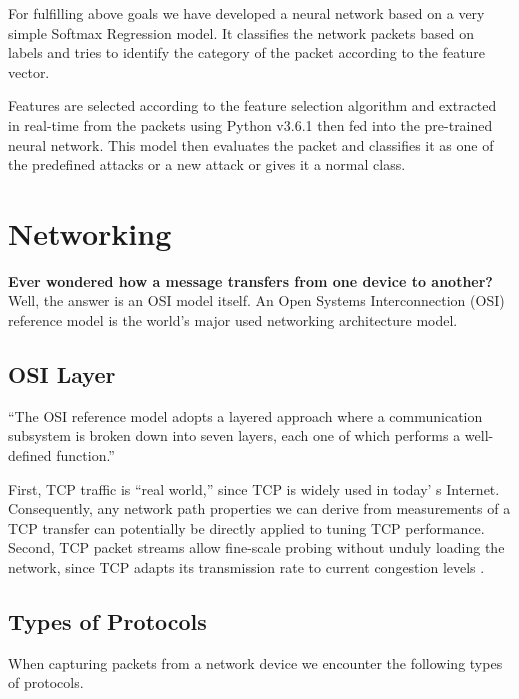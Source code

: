 \documentclass[12pt]{article}
\theoremstyle{definition}
\begin{document}
		For fulfilling above goals we have developed a neural network based on a very simple Softmax Regression model. It classifies the network packets based on labels and tries to identify the category of the packet according to the feature vector.
		
		Features are selected according to the feature selection algorithm and extracted in real-time from the packets using Python v3.6.1 then fed into the pre-trained neural network. This model then evaluates the packet and classifies it as one of the predefined attacks or a new attack or gives it a normal class.
		
	
	
	\cleardoublepage
	\section{Networking}\label{sec:netwrk}
	\textbf{Ever wondered how a message transfers from one device to another?}\\ 
	
	Well,   the   answer   is   an   OSI   model   itself.   An   Open Systems  Interconnection  (OSI)  reference  model  is  the world’s major used networking architecture model.
	
		\subsection{OSI Layer}
		``The  OSI  reference  model  adopts  a  layered  approach 
		where  a  communication subsystem  is  broken  down  into seven  layers,  each  one  of  which  performs  a well-defined function.''
		
		 First, TCP traffic is “real world,” since TCP is widely used in today' s Internet\cite{Gupta2016}.  Consequently, any network path properties we can derive from measurements of a TCP transfer can potentially be directly applied to tuning TCP performance.  Second, TCP packet streams  allow  fine-scale  probing  without  unduly  loading  the  network, since TCP adapts its transmission rate to current congestion levels \cite{Al-Yaseen2016}.
	 
		\subsection{Types of Protocols}
			When capturing packets from a network device we encounter the following types of protocols.
			
\end{document}
